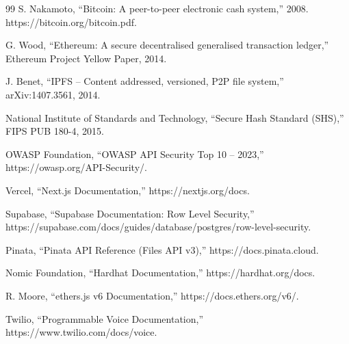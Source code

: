 \begin{thebibliography}{99}
S. Nakamoto, ``Bitcoin: A peer-to-peer electronic cash system,'' 2008. https://bitcoin.org/bitcoin.pdf.

G. Wood, ``Ethereum: A secure decentralised generalised transaction ledger,'' Ethereum Project Yellow Paper, 2014.

J. Benet, ``IPFS -- Content addressed, versioned, P2P file system,'' arXiv:1407.3561, 2014.

National Institute of Standards and Technology, ``Secure Hash Standard (SHS),'' FIPS PUB 180-4, 2015.

OWASP Foundation, ``OWASP API Security Top 10 -- 2023,'' https://owasp.org/API-Security/.

Vercel, ``Next.js Documentation,'' https://nextjs.org/docs.

Supabase, ``Supabase Documentation: Row Level Security,'' https://supabase.com/docs/guides/database/postgres/row-level-security.

Pinata, ``Pinata API Reference (Files API v3),'' https://docs.pinata.cloud.

Nomic Foundation, ``Hardhat Documentation,'' https://hardhat.org/docs.

R. Moore, ``ethers.js v6 Documentation,'' https://docs.ethers.org/v6/.

Twilio, ``Programmable Voice Documentation,'' https://www.twilio.com/docs/voice.
\end{thebibliography}
